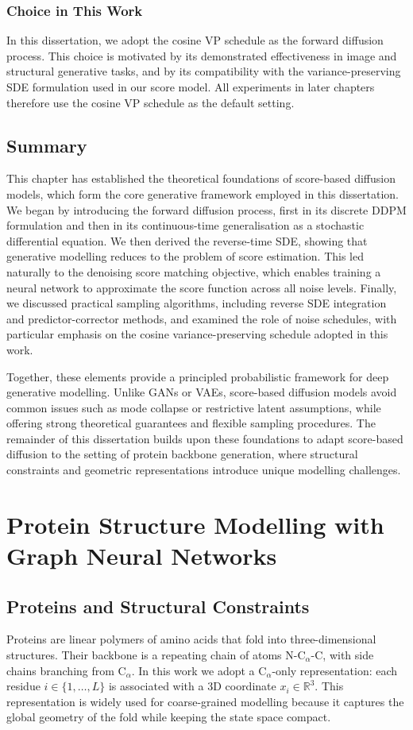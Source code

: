 \documentclass[a4paper,12pt]{article}
\begin{document}
\subsubsection*{Choice in This Work}
In this dissertation, we adopt the cosine VP schedule as the forward diffusion process. This choice is motivated by its demonstrated effectiveness in image and structural generative tasks, and by its compatibility with the variance-preserving SDE formulation used in our score model. All experiments in later chapters therefore use the cosine VP schedule as the default setting.

\subsection{Summary}
This chapter has established the theoretical foundations of score-based diffusion models, which form the core generative framework employed in this dissertation. We began by introducing the forward diffusion process, first in its discrete DDPM formulation and then in its continuous-time generalisation as a stochastic differential equation. We then derived the reverse-time SDE, showing that generative modelling reduces to the problem of score estimation. This led naturally to the denoising score matching objective, which enables training a neural network to approximate the score function across all noise levels. Finally, we discussed practical sampling algorithms, including reverse SDE integration and predictor-corrector methods, and examined the role of noise schedules, with particular emphasis on the cosine variance-preserving schedule adopted in this work.

Together, these elements provide a principled probabilistic framework for deep generative modelling. Unlike GANs or VAEs, score-based diffusion models avoid common issues such as mode collapse or restrictive latent assumptions, while offering strong theoretical guarantees and flexible sampling procedures. The remainder of this dissertation builds upon these foundations to adapt score-based diffusion to the setting of protein backbone generation, where structural constraints and geometric representations introduce unique modelling challenges.

\clearpage

\section{Protein Structure Modelling with Graph Neural Networks}\label{sec:protein-gnn}
\subsection{Proteins and Structural Constraints}\label{subsec:proteins-constraints}
Proteins are linear polymers of amino acids that fold into three-dimensional structures. Their backbone is a repeating chain of atoms N-C\(_\alpha\)-C, with side chains branching from C\(_\alpha\). In this work we adopt a C\(_\alpha\)-only representation: each residue \(i \in \{1,\dots,L\}\) is associated with a 3D coordinate \(x_i \in \mathbb{R}^3\). This representation is widely used for coarse-grained modelling because it captures the global geometry of the fold while keeping the state space compact.
\end{document}

